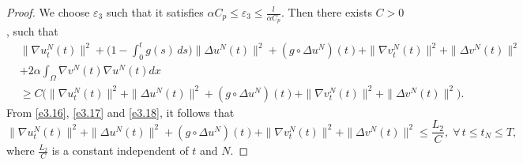 \documentclass[11pt]{article}
\numberwithin{equation}{section}
\begin{document}
\begin{proof}
We choose $\varepsilon_{3}$ such that it satisfies
$\alpha C_p \leq \varepsilon_{3}\leq \frac{l}{\alpha C_p}$.
Then there exists $C>0$, such that
\begin{equation}
\begin{aligned}
&\| \nabla u^N_{t}(t) \|^2+\Big( 1 - \int_0^t g(s)\,ds \Big) \| \Delta u^N(t) \|^2
+ (g \circ \Delta u^N)(t) + \| \nabla v^N_{t}(t) \|^2+ \| \Delta v^N(t) \|^2\\
&+2 \alpha \int_{\Omega} \nabla v^N (t)\nabla u^N (t) dx \\
&\geq C \Big( \| \nabla u^N_{t}(t) \|^2+ \| \Delta u^N (t)\|^2
+ (g \circ \Delta u^N)(t) + \| \nabla v^N_{t}(t) \|^2
+ \| \Delta v^N (t)\|^2 \Big).
\end{aligned} \label{e3.18}
\end{equation}
From \eqref{e3.16}, \eqref{e3.17} and \eqref{e3.18}, it follows that
\begin{equation}
\| \nabla u^N_{t}(t) \|^2+ \| \Delta u^N(t) \|^2 + (g \circ \Delta u^N)(t)
+ \| \nabla v^N_{t}(t) \|^2+ \| \Delta v^N(t) \|^2
\leq \frac{L_2}{C}, \; \forall\, t\leq t_{N} \leq T,\label{e3.19}
 \end{equation}
where $\frac{L_2}{C}$ is a constant independent of $t$ and $N$.
\smallskip


\end{proof}
\end{document}
